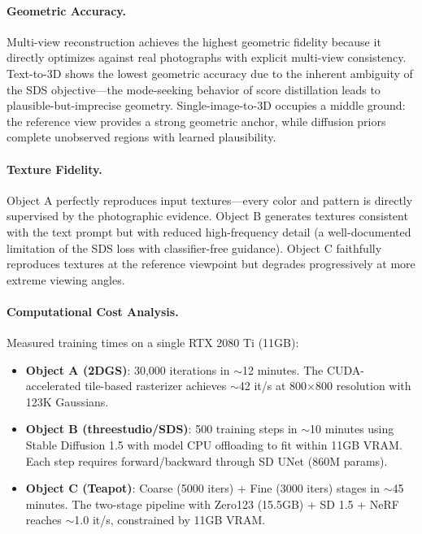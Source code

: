 \documentclass{article}
\begin{document}
\paragraph{Geometric Accuracy.}
Multi-view reconstruction achieves the highest geometric fidelity because it
directly optimizes against real photographs with explicit multi-view consistency.
Text-to-3D shows the lowest geometric accuracy due to the inherent ambiguity of
the SDS objective---the mode-seeking behavior of score distillation leads to
plausible-but-imprecise geometry. Single-image-to-3D occupies a middle ground:
the reference view provides a strong geometric anchor, while diffusion priors
complete unobserved regions with learned plausibility.

\paragraph{Texture Fidelity.}
Object A perfectly reproduces input textures---every color and pattern is
directly supervised by the photographic evidence. Object B generates textures
consistent with the text prompt but with reduced high-frequency detail (a
well-documented limitation of the SDS loss with classifier-free guidance).
Object C faithfully reproduces textures at the reference viewpoint but
degrades progressively at more extreme viewing angles.

\paragraph{Computational Cost Analysis.}
Measured training times on a single RTX 2080 Ti (11GB):
\begin{itemize}[leftmargin=*]
    \item \textbf{Object A (2DGS)}: 30,000 iterations in $\sim$12 minutes.
    The CUDA-accelerated tile-based rasterizer achieves $\sim$42 it/s at
    800$\times$800 resolution with 123K Gaussians.
    \item \textbf{Object B (threestudio/SDS)}: 500 training steps in $\sim$10 minutes
    using Stable Diffusion 1.5 with model CPU offloading to fit within 11GB VRAM.
    Each step requires forward/backward through SD UNet (860M params).
    \item \textbf{Object C (Teapot)}: Coarse (5000 iters) + Fine (3000 iters)
    stages in $\sim$45 minutes. The two-stage pipeline with Zero123 (15.5GB) +
    SD 1.5 + NeRF reaches $\sim$1.0 it/s, constrained by 11GB VRAM.
\end{itemize}
\end{document}
